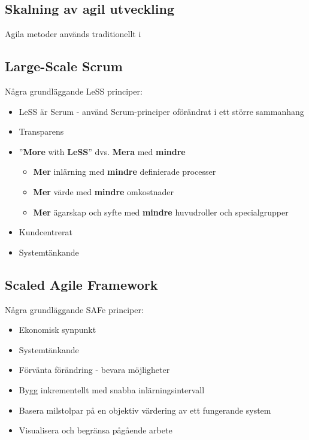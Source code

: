	\subsection{Skalning av agil utveckling}
	Agila metoder används traditionellt i 
	
	
	\subsection{Large-Scale Scrum}
	
	
	
	
	Några grundläggande LeSS principer: \cite{less_principles}
	
	\begin{itemize}
		\setlength{\itemsep}{1pt}
		\item LeSS är Scrum - använd Scrum-principer oförändrat i ett större sammanhang			
		\item Transparens
		\item ''\textbf{More} with \textbf{LeSS}'' dvs. \textbf{Mera} med \textbf{mindre}
			\begin{itemize}
				\item \textbf{Mer} inlärning med \textbf{mindre} definierade processer
				\item \textbf{Mer} värde med \textbf{mindre} omkostnader
				\item \textbf{Mer} ägarskap och syfte med \textbf{mindre} huvudroller och specialgrupper
			\end{itemize}
		\item Kundcentrerat
		\item Systemtänkande
	\end{itemize}
	
	\subsection{Scaled Agile Framework}
	
	
	Några grundläggande SAFe principer: \cite{safe_principles}
	\begin{itemize}
		\item Ekonomisk synpunkt
		\item Systemtänkande
		\item Förvänta förändring - bevara möjligheter
		\item Bygg inkrementellt med snabba inlärningsintervall
		\item Basera milstolpar på en objektiv värdering av ett fungerande system
		\item Visualisera och begränsa pågående arbete
	\end{itemize}
	
